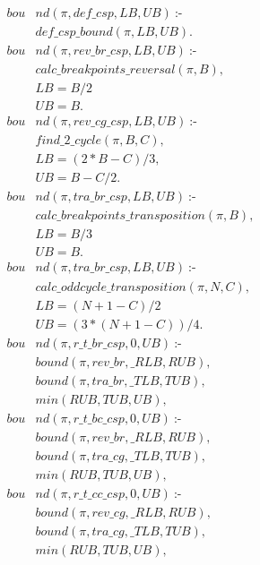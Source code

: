 \begin{align}
  \label{bound}
  \begin{split}
  \textit{bou}&\textit{nd}(\pi, def\_csp, LB, UB)~\text{:-} \\
  &\textit{def\_csp\_bound}(\pi, LB, UB).  \\
  \textit{bou}&\textit{nd}(\pi, rev\_br\_csp, LB, UB)~\text{:-}  \\
  &\textit{calc\_breakpoints\_reversal}(\pi, B), \\
  &LB = B / 2  \\ %
  &UB = B.  \\
  \textit{bou}&\textit{nd}(\pi, rev\_cg\_csp, LB, UB)~\text{:-}  \\
  &\textit{find\_2\_cycle}(\pi, B, C), \\
  &LB = (2 * B - C) / 3 ,   \\
  &UB = B - C / 2.  \\
  \textit{bou}&\textit{nd}(\pi, tra\_br\_csp, LB, UB)~\text{:-} \\
  &\textit{calc\_breakpoints\_transposition}(\pi, B), \\
  &LB = B / 3  \\ %
  &UB = B.   \\
  \textit{bou}&\textit{nd}(\pi, tra\_br\_csp, LB, UB)~\text{:-} \\
  &\textit{calc\_oddcycle\_transposition}(\pi, N, C), \\
  &LB = (N + 1 - C) / 2  \\ 
  &UB = (3 * (N + 1 - C)) / 4.  \\
  \textit{bou}&\textit{nd}(\pi, r\_t\_br\_csp, 0, UB)~\text{:-} \\
  &\textit{bound}(\pi, rev\_br, \_RLB, RUB), \\
  &\textit{bound}(\pi, tra\_br, \_TLB, TUB), \\
  &\textit{min}(RUB, TUB, UB), \\
  \textit{bou}&\textit{nd}(\pi, r\_t\_bc\_csp, 0, UB)~\text{:-} \\
  &\textit{bound}(\pi, rev\_br, \_RLB, RUB), \\
  &\textit{bound}(\pi, tra\_cg, \_TLB, TUB), \\
  &\textit{min}(RUB, TUB, UB), \\
  \textit{bou}&\textit{nd}(\pi, r\_t\_cc\_csp, 0, UB)~\text{:-} \\
  &\textit{bound}(\pi, rev\_cg, \_RLB, RUB), \\
  &\textit{bound}(\pi, tra\_cg, \_TLB, TUB), \\
  &\textit{min}(RUB, TUB, UB), 
  \end{split}
\end{align}

